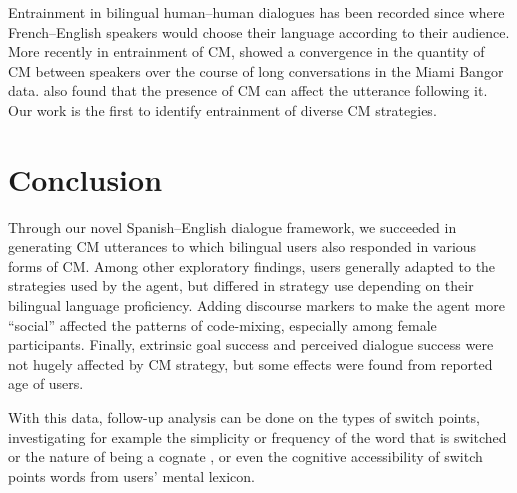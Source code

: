 \documentclass[11pt,a4paper]{article}
\begin{document}
Entrainment in bilingual human--human dialogues has been recorded since \citet{giles1973towards} where French--English speakers would choose their language according to their audience.
More recently in entrainment of CM, \citet{soto2018role} showed a convergence in the quantity of CM between speakers over the course of long conversations in the Miami Bangor data.
\citet{fricke2016primed} also found that the presence of CM can affect the utterance following it.
Our work is the first to identify entrainment of diverse CM strategies.


\section{Conclusion}
\label{sec:conclusion}

Through our novel Spanish--English dialogue framework, we succeeded in generating CM utterances to which bilingual users also responded in various forms of CM.
Among other exploratory findings, users generally adapted to the strategies used by the agent, but differed in strategy use depending on their bilingual language proficiency.
Adding discourse markers to make the agent more ``social'' affected the patterns of code-mixing, especially among female participants. 
Finally, extrinsic goal success and perceived dialogue success were not hugely affected by CM strategy, but some effects were found from reported age of users.

With this data, follow-up analysis can be done on the types of switch points, investigating for example the simplicity or frequency of the word that is switched or the nature of being a cognate \citep{soto2018role}, or even the cognitive accessibility of switch points words from users' mental lexicon.
\end{document}
